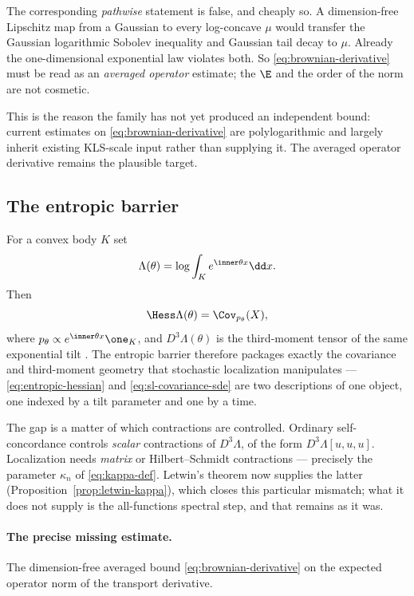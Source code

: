 \documentclass[../../main.tex]{subfiles}
\begin{document}
\begin{warning}
\label{rem:no-lipschitz-transport}
The corresponding \emph{pathwise} statement is false, and cheaply so. A dimension-free Lipschitz
map from a Gaussian to every log-concave $\mu$ would transfer the Gaussian logarithmic Sobolev
inequality and Gaussian tail decay to $\mu$. Already the one-dimensional exponential law violates
both. So \eqref{eq:brownian-derivative} must be read as an \emph{averaged operator} estimate; the
$\E$ and the order of the norm are not cosmetic.
\end{warning}

This is the reason the family has not yet produced an independent bound: current estimates on
\eqref{eq:brownian-derivative} are polylogarithmic and largely inherit existing KLS-scale input
rather than supplying it. The averaged operator derivative remains the plausible target.

\subsection{The entropic barrier}
\label{subsec:transport-entropic}

For a convex body $K$ set
\[
  \Lambda(\theta)=\log\int_Ke^{\inner\theta x}\dd x .
\]
Then
\begin{equation}
  \Hess\Lambda(\theta)=\Cov_{p_\theta}(X),
  \label{eq:entropic-hessian}
\end{equation}
where $p_\theta\propto e^{\inner\theta x}\one_K$, and $D^3\Lambda(\theta)$ is the third-moment
tensor of the same exponential tilt \cite{BubeckEldan2014EntropicBarrier}. The entropic barrier
therefore packages exactly the covariance and third-moment geometry that stochastic localization
manipulates --- \eqref{eq:entropic-hessian} and \eqref{eq:sl-covariance-sde} are two descriptions
of one object, one indexed by a tilt parameter and one by a time.

The gap is a matter of which contractions are controlled. Ordinary self-concordance controls
\emph{scalar} contractions of $D^3\Lambda$, of the form $D^3\Lambda[u,u,u]$. Localization needs
\emph{matrix} or Hilbert--Schmidt contractions --- precisely the parameter $\kappa_n$ of
\eqref{eq:kappa-def}. Letwin's theorem now supplies the latter
(Proposition~\ref{prop:letwin-kappa}), which closes this particular mismatch; what it does not
supply is the all-functions spectral step, and that remains as it was.

\paragraph{The precise missing estimate.}
The dimension-free averaged bound \eqref{eq:brownian-derivative} on the expected operator norm of
the transport derivative.
\end{document}
